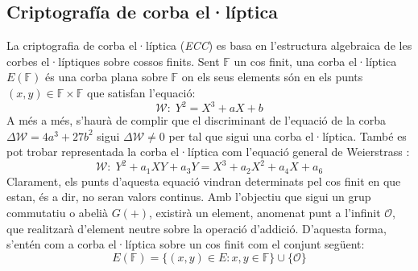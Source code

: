 \documentclass{article}
\begin{document}
\subsection{Criptografía de corba el·líptica}\label{sec:cripto-ecc}
La criptografia de corba el·líptica (\textit{ECC}) es basa en l'estructura algebraica de les corbes el·líptiques sobre cossos finits. Sent $\mathbb{F}$ un cos finit, 
una corba el·líptica $E(\mathbb{F})$ és una corba plana sobre $\mathbb{F}$ on els seus elements són en els punts $(x, y) \in \mathbb{F} \times \mathbb{F}$ que satisfan l'equació:
\[\mathcal{W} : \; Y^2 = X^3 + aX + b\]
A més a més, s'haurà de complir que el discriminant de l'equació de la corba $\Delta \mathcal{W} = 4a^3 + 27b^2$ sigui $\Delta \mathcal{W} \neq 0$ per tal que sigui una corba el·líptica. També es pot trobar representada la corba el·líptica com l'equació general de Weierstrass \cite{ecc:normal-form}:
\[\mathcal{W} : \; Y^2 + a_1XY + a_3Y = X^3 + a_2X^2 + a_4X + a_6 \]
Clarament, els punts d'aquesta equació vindran determinats pel cos finit en que estan, és a dir, no seran valors continus. Amb l'objectiu que sigui un grup commutatiu o abelià $G(+)$, existirà un element, anomenat punt a l'infinit $\mathcal{O}$, que realitzarà d'element neutre sobre la operació d'addició. D'aquesta forma, s'entén com a corba el·líptica sobre un cos finit com el conjunt següent:
\[ E(\mathbb{F}) = \{(x, y) \in E : x, y \in \mathbb{F} \} \cup \{\mathcal{O}\}\]
\end{document}
